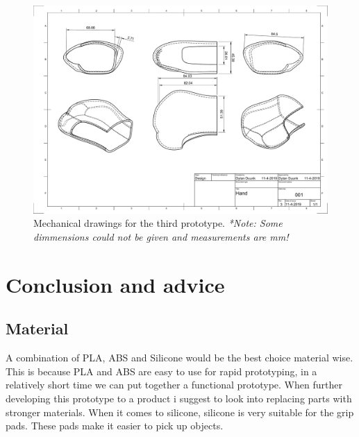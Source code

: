 \documentclass[11pt, a4paper]{article}
\begin{document}
\newpage

\begin{landscape}
    \thispagestyle{empty}
    \begin{figure}[h]
        \centering
        \includegraphics[scale=0.5]{Hand_Drawing_v2.pdf}
        \caption{Mechanical drawings for the third prototype. \textit{*Note: Some dimmensions could not be given and measurements are mm!}}
        \label{fig:Prototype3Mechanical}
    \end{figure} 
\end{landscape}

\newpage

\section{Conclusion and advice}

\subsection{Material}
A combination of PLA, ABS and Silicone would be the best choice material wise. 
This is because PLA and ABS are easy to use for rapid prototyping, in a relatively short time we can put together a functional prototype.
When further developing this prototype to a product i suggest to look into replacing parts with stronger materials.
When it comes to silicone, silicone is very suitable for the grip pads.
These pads make it easier to pick up objects.
\end{document}
